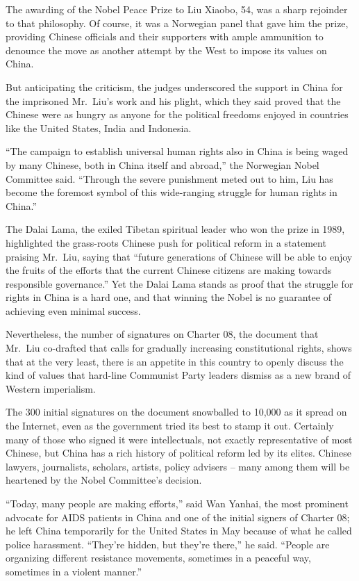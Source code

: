 ﻿\documentclass[12pt]{article}
\begin{document}
The awarding of the Nobel Peace Prize to Liu Xiaobo, 54, was a sharp rejoinder to that philosophy.
Of course, it was a Norwegian panel that gave him the prize, providing Chinese officials and their
supporters with ample ammunition to denounce the move as another attempt by the West to impose its
values on China.

But anticipating the criticism, the judges underscored the support in China for the imprisoned
Mr.~Liu's work and his plight, which they said proved that the Chinese were as hungry as anyone for
the political freedoms enjoyed in countries like the United States, India and Indonesia.

``The campaign to establish universal human rights also in China is being waged by many Chinese,
both in China itself and abroad,'' the Norwegian Nobel Committee said. ``Through the severe
punishment meted out to him, Liu has become the foremost symbol of this wide-ranging struggle for
human rights in China.''

The Dalai Lama, the exiled Tibetan spiritual leader who won the prize in 1989, highlighted the
grass-roots Chinese push for political reform in a statement praising Mr.~Liu, saying that ``future
generations of Chinese will be able to enjoy the fruits of the efforts that the current Chinese
citizens are making towards responsible governance.'' Yet the Dalai Lama stands as proof that the
struggle for rights in China is a hard one, and that winning the Nobel is no guarantee of achieving
even minimal success.

Nevertheless, the number of signatures on Charter 08, the document that Mr.~Liu co-drafted that
calls for gradually increasing constitutional rights, shows that at the very least, there is an
appetite in this country to openly discuss the kind of values that hard-line Communist Party leaders
dismiss as a new brand of Western imperialism.

The 300 initial signatures on the document snowballed to 10,000 as it spread on the Internet, even
as the government tried its best to stamp it out. Certainly many of those who signed it were
intellectuals, not exactly representative of most Chinese, but China has a rich history of political
reform led by its elites. Chinese lawyers, journalists, scholars, artists, policy advisers -- many
among them will be heartened by the Nobel Committee's decision.

``Today, many people are making efforts,'' said Wan Yanhai, the most prominent advocate for AIDS
patients in China and one of the initial signers of Charter 08; he left China temporarily for the
United States in May because of what he called police harassment. ``They're hidden, but they're
there,'' he said. ``People are organizing different resistance movements, sometimes in a peaceful
way, sometimes in a violent manner.''
\end{document}
